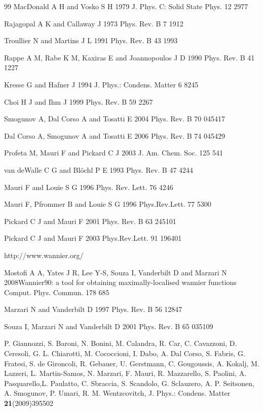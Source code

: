 {\begin{thebibliography} {99}
 MacDonald A H and Vosko S H 1979 J. Phys. C: Solid State
Phys. 12 2977

Rajagopal A K and Callaway J 1973 Phys. Rev. B 7 1912

Troullier N and Martins J L 1991 Phys. Rev. B 43 1993

Rappe A M, Rabe K M, Kaxiras E and Joannopoulos J D 1990
Phys. Rev. B 41 1227

Kresse G and Hafner J 1994 J. Phys.: Condens. Matter
6 8245

Choi H J and Ihm J 1999 Phys. Rev. B 59 2267

Smogunov A, Dal Corso A and Tosatti E 2004 Phys. Rev. B
70 045417

Dal Corso A, Smogunov A and Tosatti E 2006 Phys. Rev. B
74 045429


 Profeta M, Mauri F and Pickard C J 2003 J. Am. Chem. Soc.
125 541

van deWalle C G and Bl\"{o}chl P E 1993 Phys. Rev. B 47 4244

 Mauri F and Louie S G 1996 Phys. Rev. Lett. 76 4246

Mauri F, Pfrommer B and Louie S G 1996 Phys.Rev.Lett.
77 5300

Pickard C J and Mauri F 2001 Phys. Rev. B 63 245101

 Pickard C J and Mauri F 2003 Phys.Rev.Lett. 91 196401

http://www.wannier.org/

Mostofi A A, Yates J R, Lee Y-S, Souza I, Vanderbilt D and
Marzari N 2008Wannier90: a tool for obtaining
maximally-localised wannier functions Comput. Phys.
Commun. 178 685



 Marzari N and Vanderbilt D 1997 Phys. Rev. B 56 12847

Souza I, Marzari N and Vanderbilt D 2001 Phys. Rev. B
65 035109

P. Giannozzi, S. Baroni, N. Bonini, M. Calandra, R. Car, C. Cavazzoni,
D. Ceresoli, G. L. Chiarotti, M. Cococcioni, I. Dabo, A. Dal Corso,
S. Fabris, G. Fratesi, S. de Gironcoli, R. Gebauer, U. Gerstmann, C.
Gougoussis, A. Kokalj, M. Lazzeri, L. Martin-Samos, N. Marzari, F.
Mauri, R. Mazzarello, S. Paolini, A. Pasquarello,L. Paulatto, C.
Sbraccia, S. Scandolo, G. Sclauzero, A. P. Seitsonen, A. Smogunov,
P. Umari, R. M. Wentzcovitch, J. Phys.: Condens. Matter
{\bf21}(2009)395502


\end{thebibliography}}
